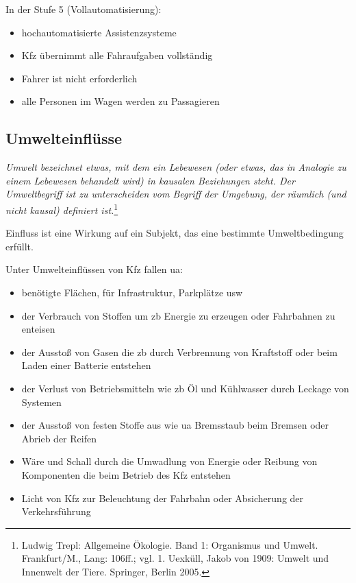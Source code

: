 In der Stufe 5 (Vollautomatisierung):
\begin{itemize}
	\item hochautomatisierte Assistenzsysteme
	\item \ac{Kfz} übernimmt alle Fahraufgaben vollständig
	\item Fahrer ist nicht erforderlich
	\item alle Personen im Wagen werden zu Passagieren
\end{itemize}


\subsection{Umwelteinflüsse}

\textit{Umwelt bezeichnet etwas, mit dem ein Lebewesen (oder etwas, das in Analogie zu einem Lebewesen behandelt wird) in kausalen Beziehungen steht. Der Umweltbegriff ist zu unterscheiden vom Begriff der Umgebung, der räumlich (und nicht kausal) definiert ist.}\footnote{Ludwig Trepl: Allgemeine Ökologie. Band 1: Organismus und Umwelt. Frankfurt/M., Lang: 106ff.; vgl. 1. Uexküll, Jakob von 1909: Umwelt und Innenwelt der Tiere. Springer, Berlin 2005.}

Einfluss ist eine Wirkung auf ein Subjekt, das eine bestimmte Umweltbedingung erfüllt.

Unter Umwelteinflüssen von \ac{Kfz} fallen \ac{ua}:
\begin{itemize}
	\item benötigte Flächen, für Infrastruktur, Parkplätze \ac{usw}
	\item der Verbrauch von Stoffen um \ac{zb} Energie zu erzeugen oder Fahrbahnen zu enteisen
	\item der Ausstoß von Gasen die \ac{zb} durch Verbrennung von Kraftstoff oder beim Laden einer Batterie entstehen
	\item der Verlust von Betriebsmitteln wie \ac{zb} Öl und Kühlwasser durch Leckage von Systemen
	\item der Ausstoß von festen Stoffe aus wie \ac{ua} Bremsstaub beim Bremsen oder Abrieb der Reifen
	\item Wäre und Schall durch die Umwadlung von Energie oder Reibung von Komponenten die beim Betrieb des \ac{Kfz} entstehen
	\item Licht von \ac{Kfz} zur Beleuchtung der Fahrbahn oder Absicherung der Verkehrsführung
\end{itemize}




